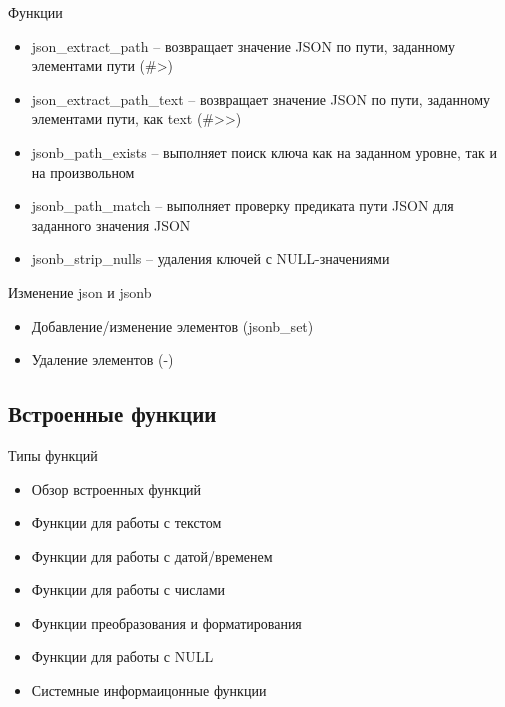 \documentclass[12pt]{article}
\begin{document}
\begin{nota}{Функции}
    \begin{itemize}
        \item json\_extract\_path -- возвращает значение JSON по пути, заданному элементами пути (\#>)
        \item json\_extract\_path\_text -- возвращает значение JSON по пути, заданному элементами пути, как text (\#>>)
        \item jsonb\_path\_exists -- выполняет поиск ключа как на заданном уровне, так и на произвольном 
        \item jsonb\_path\_match -- выполняет проверку предиката пути JSON для заданного значения JSON
        \item jsonb\_strip\_nulls -- удаления ключей с NULL-значениями
    \end{itemize}
\end{nota}

\begin{nota}{Изменение json и jsonb}
    \begin{itemize}
        \item Добавление/изменение элементов (jsonb\_set)
        \item Удаление элементов (-)
    \end{itemize}
\end{nota}

\newpage

\subsection{Встроенные функции}

\begin{nota}{Типы функций}
    \begin{itemize}
        \item Обзор встроенных функций 
        \item Функции для работы с текстом 
        \item Функции для работы с датой/временем 
        \item Функции для работы с числами 
        \item Функции преобразования и форматирования 
        \item Функции для работы с NULL 
        \item Системные информаицонные функции
    \end{itemize}
\end{nota}
\end{document}
